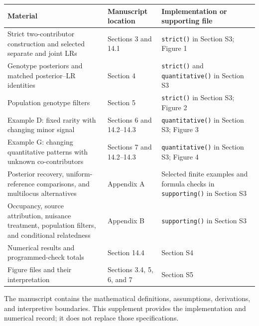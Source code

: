 \documentclass[
]{article}
\newcounter{none} %
\begin{document}
{\def\LTcaptype{none} %
\begin{longtable}[]{@{}
  >{\raggedright\arraybackslash}p{}
  >{\raggedright\arraybackslash}p{}
  >{\raggedright\arraybackslash}p{}@{}}
\toprule\noalign{}
\begin{minipage}[b]{\linewidth}\raggedright
Material
\end{minipage} & \begin{minipage}[b]{\linewidth}\raggedright
Manuscript location
\end{minipage} & \begin{minipage}[b]{\linewidth}\raggedright
Implementation or supporting file
\end{minipage} \\
\midrule\noalign{}
\endhead
\bottomrule\noalign{}
\endlastfoot
Strict two-contributor construction and selected separate and joint LRs
& Sections 3 and 14.1 & \texttt{strict()} in Section S3; Figure 1 \\
Genotype posteriors and matched posterior--LR identities & Section 4 &
\texttt{strict()} and \texttt{quantitative()} in Section S3 \\
Population genotype filters & Section 5 & \texttt{strict()} in Section
S3; Figure 2 \\
Example D: fixed rarity with changing minor signal & Sections 6 and
14.2--14.3 & \texttt{quantitative()} in Section S3; Figure 3 \\
Example G: changing quantitative patterns with unknown co-contributors &
Sections 7 and 14.2--14.3 & \texttt{quantitative()} in Section S3;
Figure 4 \\
Posterior recovery, uniform-reference comparisons, and multilocus
alternatives & Appendix A & Selected finite examples and formula checks
in \texttt{supporting()} in Section S3 \\
Occupancy, source attribution, nuisance treatment, population filters,
and conditional relatedness & Appendix B & \texttt{supporting()} in
Section S3 \\
Numerical results and programmed-check totals & Section 14.4 & Section
S4 \\
Figure files and their interpretation & Sections 3.4, 5, 6, and 7 &
Section S5 \\
\end{longtable}
}

The manuscript contains the mathematical definitions, assumptions,
derivations, and interpretive boundaries. This supplement provides the
implementation and numerical record; it does not replace those
specifications.
\end{document}
